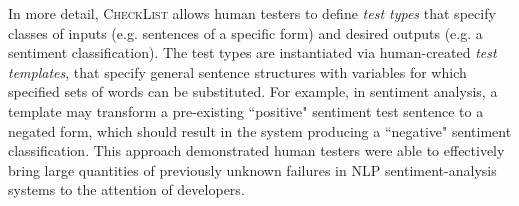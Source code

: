 \documentclass[letterpaper]{article} %
\begin{document}
In more detail, \textsc{CheckList} allows human testers to define \emph{test types} that specify classes of inputs (e.g. sentences of a specific form) and desired outputs (e.g. a sentiment classification). The test types are instantiated via human-created \emph{test templates}, that specify general sentence structures with variables for which specified sets of words can be substituted. 
For example, in sentiment analysis, a template may transform a pre-existing ``positive" sentiment test sentence to a negated form, which should result in the system producing a ``negative" sentiment classification. This approach demonstrated human testers were able to effectively bring large quantities of previously unknown failures in NLP sentiment-analysis systems to the attention of developers.
\end{document}
